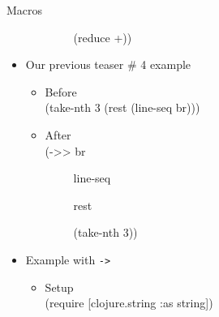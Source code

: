 \documentclass{beamer}
\begin{document}
\begin{frame}[allowframebreaks]{Macros}
\begin{itemize}
\begin{itemize}
{\ttfamily\color{black}
\ \ \ \ \ \textcolor[rgb]{0.54901963,0.54901963,0.54901963}{(}\textcolor[rgb]{0.28235295,0.23921569,0.54509807}{reduce}
+\textcolor[rgb]{0.54901963,0.54901963,0.54901963}{))}}
    \end{itemize}
  \item Our previous teaser \# 4 example
    \begin{itemize}
    \item Before\\
{\ttfamily\color{black}
\textcolor[rgb]{0.54901963,0.54901963,0.54901963}{(}\textcolor[rgb]{0.28235295,0.23921569,0.54509807}{take-nth}
3
\textcolor[rgb]{0.54901963,0.54901963,0.54901963}{(}\textcolor[rgb]{0.28235295,0.23921569,0.54509807}{rest}
\textcolor[rgb]{0.54901963,0.54901963,0.54901963}{(}\textcolor[rgb]{0.28235295,0.23921569,0.54509807}{line-seq}
br\textcolor[rgb]{0.54901963,0.54901963,0.54901963}{)))}}
    \item After\\
{\ttfamily\color{black}
\textcolor[rgb]{0.54901963,0.54901963,0.54901963}{(}\textcolor[rgb]{0.49803922,0.0,0.49803922}{{}-{\textgreater}{\textgreater}}
br}

{\ttfamily\color{black}
\ \ \ \ \ line-seq}

{\ttfamily\color{black}
\ \ \ \ \ rest}

{\ttfamily\color{black}
\ \ \ \ \ \textcolor[rgb]{0.54901963,0.54901963,0.54901963}{(}\textcolor[rgb]{0.28235295,0.23921569,0.54509807}{take-nth}
3\textcolor[rgb]{0.54901963,0.54901963,0.54901963}{))}}
    \end{itemize}
  \item Example with \texttt{->}
    \begin{itemize}
    \item Setup\\
{\ttfamily\color{black}
\textcolor[rgb]{0.54901963,0.54901963,0.54901963}{(}\textcolor[rgb]{0.28235295,0.23921569,0.54509807}{require}
{\textquotesingle}[clojure.string
\textcolor[rgb]{0.0,0.54509807,0.54509807}{:as}
string]\textcolor[rgb]{0.54901963,0.54901963,0.54901963}{)}}


\end{itemize}
\end{itemize}
\end{frame}
\end{document}
